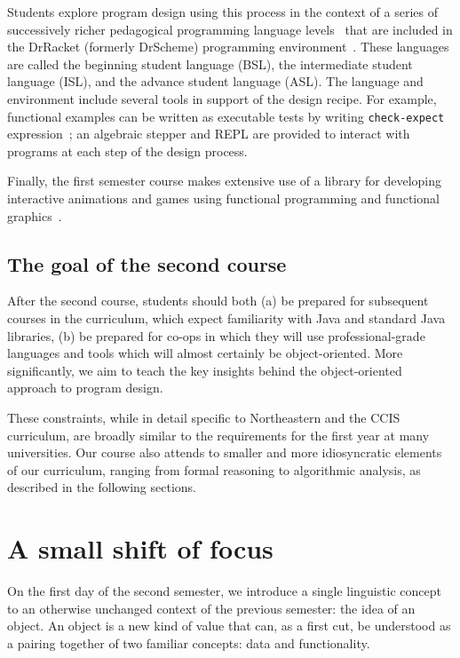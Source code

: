 \documentclass[submission,copyright]{eptcs}
\begin{document}
Students explore program design using this process in the context of a
series of successively richer pedagogical programming language
levels~\cite{dvanhorn:Felleisen2004Structure,
  dvanhorn:Felleisen2001How} that are included in the DrRacket
(formerly DrScheme) programming
environment~\cite{dvanhorn:Findler2002DrScheme}.
%
These languages are called the beginning student language (BSL), the
intermediate student language (ISL), and the advance student language
(ASL).
%
The language and environment include several tools in support of the
design recipe.  For example, functional examples can be written as
executable tests by writing \texttt{check-expect}
expression~\cite{local:check-expect}; an algebraic stepper and REPL
are provided to interact with programs at each step of the design
process.

Finally, the first semester course makes extensive use of a library
for developing interactive animations and games using functional
programming and functional
graphics~\cite{dvanhorn:Felleisen2009Functional, local:barland-sfp10}.

\subsection{The goal of the second course}

After the second course, students should both (a) be prepared for
subsequent courses in the curriculum, which expect familiarity with
Java and standard Java libraries, (b) be prepared for co-ops in which
they will use professional-grade languages and tools which will almost
certainly be object-oriented.  More significantly, we aim to teach the
key insights behind the object-oriented approach to program design.

These constraints, while in detail specific to Northeastern and the
CCIS curriculum, are broadly similar to the requirements for the first
year at many universities.  Our course also attends to smaller and
more idiosyncratic elements of our curriculum, ranging from formal
reasoning to algorithmic analysis, as described in the following
sections.



\section{A small shift of focus}
\label{sec:shift}

On the first day of the second semester, we introduce a single
linguistic concept to an otherwise unchanged context of the previous
semester: the idea of an object.
%
An object is a new kind of value that can, as a first cut, be
understood as a pairing together of two familiar concepts: data and
functionality.
\end{document}
